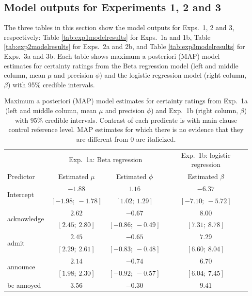 \documentclass[11pt,fleqn]{article}
\newcommand{\6}{\mbox{$[\hspace*{-.6mm}[$}}
\newcommand{\9}{\mbox{$]\hspace*{-.6mm}]$}}
\begin{document}
\subsection{Model outputs for Experiments 1, 2 and 3}\label{a-mo}

The three tables in this section show the model outputs for Exps.~1, 2 and 3, respectively: Table \ref{tab:exp1modelresults} for Exps.~1a and 1b, Table \ref{tab:exp2modelresults} for Exps.~2a and 2b, and Table \ref{tab:exp3modelresults} for Exps.~3a and 3b. Each table shows maximum a posteriori (MAP) model estimates for certainty ratings from the Beta regression model (left and middle column, mean $\mu$ and precision $\phi$) and the logistic regression model (right column, $\beta$)  with 95\% credible intervals.

\begin{table}
\caption{Maximum a posteriori (MAP) model estimates for certainty ratings from Exp.~1a (left and middle column, mean $\mu$ and precision $\phi$) and Exp.~1b (right column, $\beta$)  with 95\% credible intervals. Contrast of each predicate is with main clause control reference level. MAP estimates for which there is no evidence that they are different from 0 are italicized.}
\small
\begin{center}
\begin{tabular}{l c c c}
\toprule
& \multicolumn{2}{c}{Exp.~1a: Beta regression} & Exp.~1b: logistic regression \\
Predictor & Estimated $\mu$ & Estimated $\phi$ & Estimated $\beta$\\
\midrule
\multirow{2}{*}{Intercept} & $-1.88 $  & $1.16 $ & $-6.37 $       \\
& $[-1.98;\ -1.78]$ & $[1.02;\ 1.29]$  & $[-7.10;\ -5.72]$ \\
[.25em]
\multirow{2}{*}{acknowledge} & $2.62 $ & $-0.67 $  & $8.00 $        \\
& $[2.45;\ 2.80]$  & $[-0.86;\ -0.49]$ & $[7.31;\ 8.78]$   \\
[.25em]
\multirow{2}{*}{admit} & $2.45 $ & $-0.65 $  & $7.29 $        \\
& $[2.29;\ 2.61]$  & $[-0.83;\ -0.48]$ & $[6.60;\ 8.04]$   \\
[.25em]
\multirow{2}{*}{announce}  & $2.14 $ & $-0.74 $  & $6.70 $        \\
& $[1.98;\ 2.30]$  & $[-0.92;\ -0.57]$ & $[6.04;\ 7.45]$   \\
[.25em]
\multirow{2}{*}{be annoyed} & $3.56 $ & $-0.30 $  & $9.41 $        \\

\end{tabular}
\end{center}
\end{table}
\end{document}
